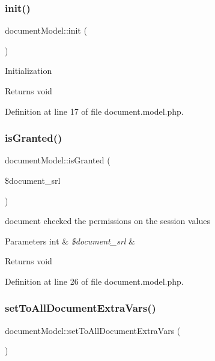 \subsubsection{\texorpdfstring{init()}{init()}}
{\footnotesize\ttfamily document\+Model\+::init (\begin{DoxyParamCaption}{ }\end{DoxyParamCaption})}

Initialization \begin{DoxyReturn}{Returns}
void 
\end{DoxyReturn}


Definition at line 17 of file document.\+model.\+php.

\mbox{\label{classdocumentModel_acca118289b1b6e55c73dc21b7ed32d9c}} 
\subsubsection{\texorpdfstring{is\+Granted()}{isGranted()}}
{\footnotesize\ttfamily document\+Model\+::is\+Granted (\begin{DoxyParamCaption}\item[{}]{\$document\+\_\+srl }\end{DoxyParamCaption})}

document checked the permissions on the session values 
\begin{DoxyParams}[1]{Parameters}
int & {\em \$document\+\_\+srl} & \\
\hline
\end{DoxyParams}
\begin{DoxyReturn}{Returns}
void 
\end{DoxyReturn}


Definition at line 26 of file document.\+model.\+php.

\mbox{\label{classdocumentModel_a030147f71d77bdf6cf23798a2264445b}} 
\subsubsection{\texorpdfstring{set\+To\+All\+Document\+Extra\+Vars()}{setToAllDocumentExtraVars()}}
{\footnotesize\ttfamily document\+Model\+::set\+To\+All\+Document\+Extra\+Vars (\begin{DoxyParamCaption}{ }\end{DoxyParamCaption})}


